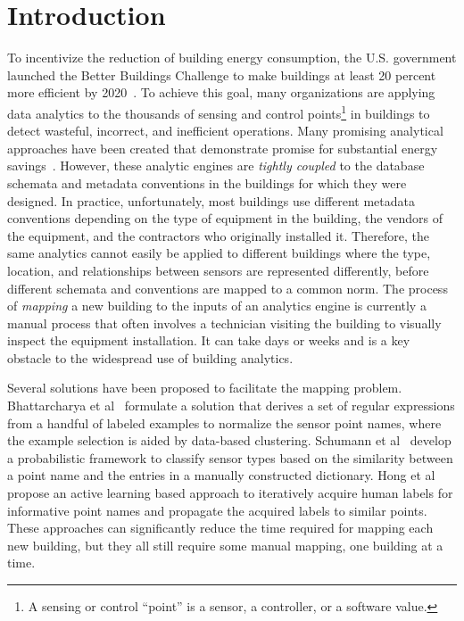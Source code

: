 \section{Introduction}

To incentivize the reduction of building energy consumption, the U.S. government
launched the Better Buildings Challenge to make buildings at least 20 percent
more efficient by 2020~\cite{doe2013better}. To achieve this goal, many
organizations are applying data analytics to the thousands of sensing and
control points\footnote{A sensing or control ``point'' is a sensor, a
controller, or a software value.} in buildings to detect wasteful, incorrect,
and inefficient operations. Many promising analytical approaches have been
created that demonstrate promise for substantial energy savings~\cite{mpc,
comfy}. However, these analytic engines are \emph{tightly coupled} to the
database schemata and metadata conventions in the buildings for which they were
designed. In practice, unfortunately, most buildings use different metadata
conventions depending on the type of equipment in the building, the vendors of
the equipment, and the contractors who originally installed it. Therefore, the
same analytics cannot easily be applied to different buildings where the type,
location, and relationships between sensors are represented differently, before
different schemata and conventions are mapped to a common norm. The process of
{\em mapping} a new building to the inputs of an analytics engine is currently a
manual process that often involves a technician visiting the building to
visually inspect the equipment installation. It can take days or weeks and is a
key obstacle to the widespread use of building analytics.

Several solutions have been proposed to facilitate the mapping problem.
Bhattarcharya et al~\cite{arka} formulate a solution that derives a set of
regular expressions from a handful of labeled examples to normalize the sensor
point names, where the example selection is aided by data-based clustering.
Schumann et al~\cite{ibm} develop a probabilistic framework to classify sensor
types based on the similarity between a point name and the entries in a manually
constructed dictionary. Hong et al~\cite{cikm} propose an active learning based
approach to iteratively acquire human labels for informative point names and
propagate the acquired labels to similar points.  These approaches can
significantly reduce the time required for mapping each new building, but they
all still require some manual mapping, one building at a time.

